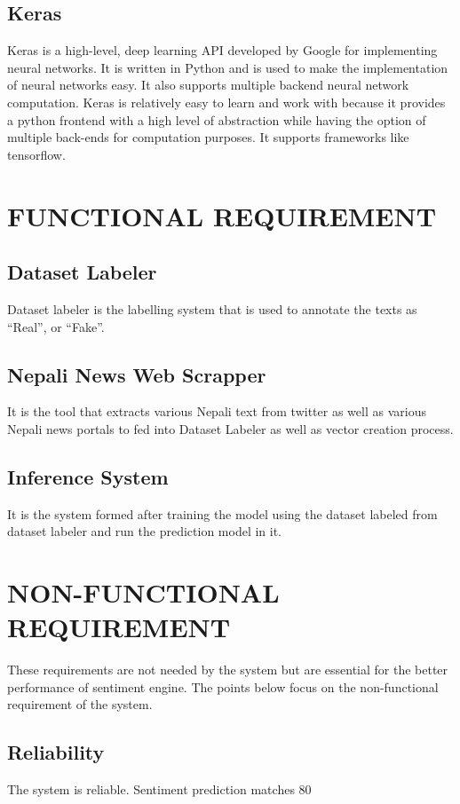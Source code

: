             \subsection{Keras}
                Keras is a high-level, deep learning API developed by Google for implementing neural networks. It is written in Python and is used to make the implementation of neural networks easy. It also supports multiple backend neural network computation. Keras is relatively easy to learn and work with because it provides a python frontend with a high level of abstraction while having the option of multiple back-ends for computation purposes. It supports frameworks like tensorflow.
                
        \section{FUNCTIONAL REQUIREMENT}
            \subsection{Dataset Labeler}
                Dataset labeler is the labelling system that is used to annotate the texts as “Real”, or “Fake”.
            \subsection{Nepali News Web Scrapper}
It is the tool that extracts various Nepali text from twitter as well as various Nepali news
portals to fed into Dataset Labeler as well as vector creation process.
            \subsection{Inference System}
It is the system formed after training the model using the dataset labeled from dataset
labeler and run the prediction model in it.

        \section{NON-FUNCTIONAL REQUIREMENT}
These requirements are not needed by the system but are essential for the better
performance of sentiment engine. The points below focus on the non-functional
requirement of the system.
            \subsection{Reliability}
The system is reliable. Sentiment prediction matches 80%
